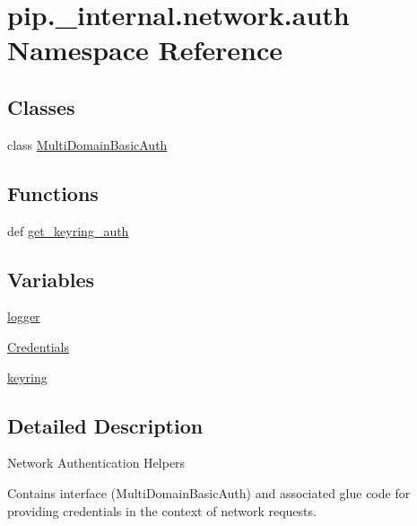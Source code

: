 \hypertarget{namespacepip_1_1__internal_1_1network_1_1auth}{}\section{pip.\+\_\+internal.\+network.\+auth Namespace Reference}
\label{namespacepip_1_1__internal_1_1network_1_1auth}
\subsection*{Classes}
\begin{DoxyCompactItemize}
\item 
class \hyperlink{classpip_1_1__internal_1_1network_1_1auth_1_1MultiDomainBasicAuth}{Multi\+Domain\+Basic\+Auth}
\end{DoxyCompactItemize}
\subsection*{Functions}
\begin{DoxyCompactItemize}
\item 
def \hyperlink{namespacepip_1_1__internal_1_1network_1_1auth_a8f6b081332f4770febc74d2322be05a9}{get\+\_\+keyring\+\_\+auth}
\end{DoxyCompactItemize}
\subsection*{Variables}
\begin{DoxyCompactItemize}
\item 
\hyperlink{namespacepip_1_1__internal_1_1network_1_1auth_a752907f944416effb2b53d03bd71dc85}{logger}
\item 
\hyperlink{namespacepip_1_1__internal_1_1network_1_1auth_a0449e0b0df7c4b0d91c244a1f1706bca}{Credentials}
\item 
\hyperlink{namespacepip_1_1__internal_1_1network_1_1auth_a2f8c256f0ae501a97dd90f548f47182e}{keyring}
\end{DoxyCompactItemize}


\subsection{Detailed Description}
\begin{DoxyVerb}Network Authentication Helpers

Contains interface (MultiDomainBasicAuth) and associated glue code for
providing credentials in the context of network requests.
\end{DoxyVerb}
 

